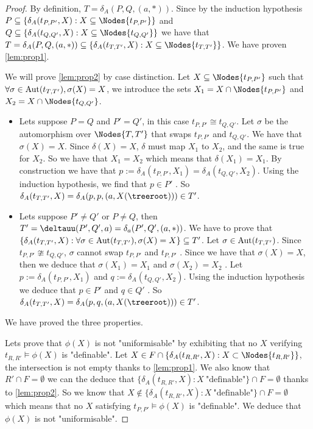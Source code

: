 \documentclass[twoside]{article}
\begin{document}
\begin{proof}
	By definition, $T = \delta_A(P,Q,(a,*))$. Since by the induction hypothesis $P \subseteq \{ \delta_A (t_{P,P'},X) : X \subseteq \Nodes {t_{P,P'}}\}$
	and $Q \subseteq \{ \delta_A (t_{Q,Q'},X) : X \subseteq \Nodes {t_{Q,Q'}}\}$  we have that
	$T = \delta_A(P,Q,(a,*)) \subseteq \{ \delta_A (t_{T,T'},X) : X \subseteq \Nodes {t_{T,T'}}\}$. We have proven \ref{lem:prop1}.


	We will prove \ref{lem:prop2} by case distinction.
	Let $X \subseteq \Nodes {t_{P,P'}}$ such that $\forall \sigma \in \text{Aut} (t_{T,T'}), \sigma(X) = X$, we introduce the
	sets $X_1 = X \cap \Nodes {t_{P,P'}}$ and $X_2 = X \cap \Nodes {t_{Q,Q'}}$.
	\begin{itemize}
		\item Lets suppose $P = Q$ and $P' = Q'$, in this case $t_{P,P'} \cong t_{Q,Q'}$. 
		      Let $\sigma$ be the automorphism over $\Nodes{T,T'}$ that swaps  $t_{P,P'}$ and $t_{Q,Q'}$.
		      We have that $\sigma (X) = X$. Since $\delta(X) = X$, $\delta$ must map $X_1$ to $X_2$, and the same is true for
		      $X_2$. So we have that $X_1 = X_2$ which means that $\delta(X_1) = X_1$. By construction we have that $p := \delta_A(t_{P,P'}, X_1) =  \delta_A(t_{Q,Q'}, X_2)$.
		      Using the induction hypothesis, we find that $p \in P'$ . So
		      $\delta_A (t_{T,T'}, X) = \delta_A(p,p,(a, X(\treeroot))) \in T'$. 

		\item Lets suppose $P' \neq Q'$ or $P \neq Q$, then $T' = \deltauu (P',Q',a) = \delta_a(P',Q',(a,*))$. We have to prove that
		      $\{ \delta_A (t_{T,T'},X) : \forall \sigma \in \text{Aut}(t_{T,T'}), \sigma(X) = X\} \subseteq T'$.
		      Let $\sigma \in \text{Aut}(t_{T,T'})$. Since $t_{P,P'} \ncong t_{Q,Q'}$, $\sigma$ cannot swap $t_{P,P'}$ and
		      $t_{P,P'}$ . Since we have that $\sigma(X) = X$, then we deduce that $\sigma(X_1) = X_1$ and
		      $\sigma(X_2) = X_2$ . Let $p := \delta_A (t_{P,P'}, X_1)$ and $q := \delta_A (t_{Q,Q'}, X_2)$.
		      Using the induction hypothesis we deduce that $p \in P'$ and $q \in Q'$ .
		      So $\delta_A (t_{T,T'}, X) = \delta_A(p,q,(a, X(\treeroot))) \in T'$.
	\end{itemize}
	We have proved the three properties.

	Lets prove that  $\phi(X)$ is not "uniformisable" by exhibiting that no $X$ verifying $t_{R,R'} \models \phi(X)$ is "definable".
	Let $X \in F \cap \{ \delta_A (t_{R,R'},X) : X \subset \Nodes {t_{R,R'}}\}$, the intersection is not empty thanks to \ref{lem:prop1}. 
	We also know that $R' \cap F = \emptyset$ we can the deduce that $\{ \delta_A (t_{R,R'},X) : X \ \text{"definable"}\} \cap F = \emptyset$
	thanks to \ref{lem:prop2}. So we know that $X \notin \{ \delta_A (t_{R,R'},X) : X \ \text{"definable"}\} \cap F = \emptyset$ which means that no
	$X$ satisfying $t_{P,P'} \models \phi(X)$ is "definable". We deduce that $\phi(X)$ is not "uniformisable".
\end{proof}
\end{document}
